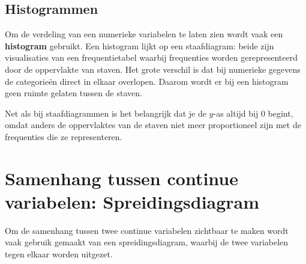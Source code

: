 \documentclass[
  a4paper,
]{scrbook}
\theoremstyle{definition}
\theoremstyle{definition}
\theoremstyle{remark}
\begin{document}
\subsection{Histogrammen}\label{histogrammen-1}

Om de verdeling van een numerieke variabelen te laten zien wordt vaak
een \textbf{histogram} gebruikt. Een histogram lijkt op een
staafdiagram: beide zijn visualisaties van een frequentietabel waarbij
frequenties worden gerepresenteerd door de oppervlakte van staven. Het
grote verschil is dat bij numerieke gegevens de categorieën direct in
elkaar overlopen. Daarom wordt er bij een histogram geen ruimte gelaten
tussen de staven.

Net als bij staafdiagrammen is het belangrijk dat je de \(y\)-as altijd
bij 0 begint, omdat anders de oppervlaktes van de staven niet meer
proportioneel zijn met de frequenties die ze representeren.

\section{Samenhang tussen continue variabelen:
Spreidingsdiagram}\label{samenhang-tussen-continue-variabelen-spreidingsdiagram}

Om de samenhang tussen twee continue variabelen zichtbaar te maken wordt
vaak gebruik gemaakt van een spreidingsdiagram, waarbij de twee
variabelen tegen elkaar worden uitgezet.
\end{document}
